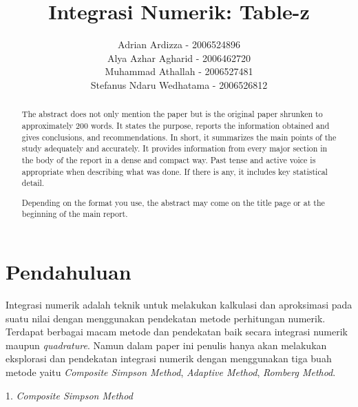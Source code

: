 \documentclass[journal,12pt,onecolumn,a4paper]{IEEEtran}
\begin{document}
\begin{titlepage}
	\title{Integrasi Numerik: Table-z}



	\author{Adrian Ardizza - 2006524896\\
		Alya Azhar Agharid - 2006462720\\
		Muhammad Athallah - 2006527481\\
		Stefanus Ndaru Wedhatama - 2006526812
	}

	\maketitle
	\begin{abstract}
		The abstract does not only mention the paper but is the original paper shrunken to approximately 200 words. It states the purpose, reports the information obtained and gives conclusions, and recommendations. In short, it summarizes the main points of the study adequately and accurately. It provides information from every major section in the body of the report in a dense and compact way. Past tense and active voice is appropriate when describing what was done. If there is any, it includes key statistical detail.

		Depending on the format you use, the abstract may come on the title page or at the beginning of the main report.

	\end{abstract}
	\tableofcontents
	\listoffigures
	\listoftables
\end{titlepage}

\IEEEpeerreviewmaketitle

\section{Pendahuluan}
Integrasi numerik adalah teknik untuk melakukan kalkulasi dan aproksimasi pada suatu nilai dengan menggunakan pendekatan metode perhitungan numerik.  Terdapat berbagai macam metode dan pendekatan baik secara integrasi numerik maupun \emph{quadrature}. Namun dalam paper ini penulis hanya akan melakukan eksplorasi dan pendekatan integrasi numerik dengan menggunakan tiga buah metode yaitu  \emph{Composite Simpson Method}, \emph{Adaptive Method}, \emph{Romberg Method}.

1. \emph{Composite Simpson Method}
\end{document}
